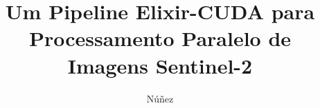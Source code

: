 \documentclass[tcc,capa]{texufpel}
\title{Um Pipeline Elixir-CUDA para Processamento Paralelo de Imagens Sentinel-2}
\author{Núñez}{Daniel Pôrto}
\begin{document}

\maketitle 

\sloppy









\end{document}

